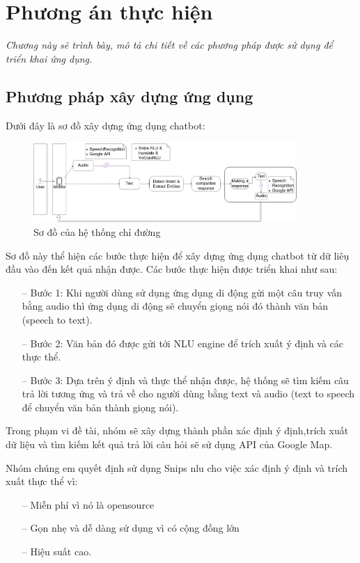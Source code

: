 \chapter{Phương án thực hiện}
\label{Chapter4}

\emph{Chương này sẽ trình bày, mô tả chi tiết về các phương pháp được sử dụng để triển khai ứng dụng.}


\section{Phương pháp xây dựng ứng dụng}
Dưới đây là sơ đồ xây dựng ứng dụng chatbot:
\begin{figure}[htp]
    \centering
    \includegraphics[width=10cm]{images/Structure-description.png}
    \caption{Sơ đồ của hệ thống chỉ đường}
    \label{fig:sodohethongchiduong}

\end{figure}

Sơ đồ này thể hiện các bước thực hiện để xây dựng ứng dụng chatbot từ dữ liêụ đầu vào đến kết quả nhận được. Các bước thực hiện được triển khai như sau:
\begin{itemize}
    \item[--] Bước 1: Khi người dùng sử dụng ứng dụng di động gửi một câu truy vấn bằng audio thì ứng dụng di động sẽ chuyển giọng nói đó thành văn bản (speech to text).
    \item[--] Bước 2: Văn bản đó được gửi tới NLU engine để trích xuất ý định và các thực thể.
    \item[--] Bước 3: Dựa trên ý định và thực thể nhận được, hệ thống sẽ tìm kiếm câu trả lời tương ứng và trả về cho người dùng bằng text và audio (text to speech để chuyển văn bản thành giọng nói).
\end{itemize}
Trong phạm vi đề tài, nhóm sẽ xây dựng thành phần xác định ý định,trích xuất dữ liệu và tìm kiếm kết quả trả lời câu hỏi sẽ sử dụng API của Google Map.

Nhóm chúng em quyết định sử dụng Snips \ac{nlu} cho việc xác định ý định và trích xuất thực thể vì:
\begin{itemize}
    \item[--] Miễn phí vì nó là opensource
    \item[--] Gọn nhẹ và dễ dàng sử dụng vì có cộng đồng lớn
    \item[--] Hiệu suất cao.
\end{itemize}

